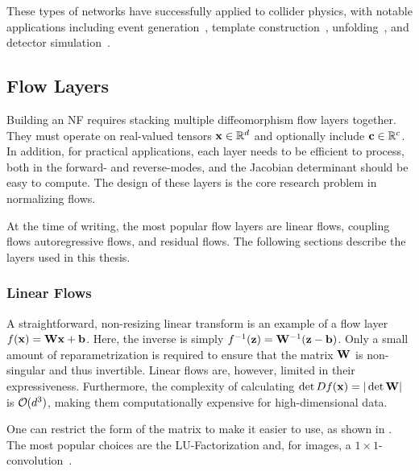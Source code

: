 These types of networks have successfully applied to collider physics, with notable applications including event generation~\cite{EventGen}, template construction~\cite{ANODE, cathode, CURTAINs}, unfolding~\cite{PartonsAndBack}, and detector simulation~\cite{CaloFlow2}.

\subsection{Flow Layers}

Building an NF requires stacking multiple diffeomorphism flow layers together.
They must operate on real-valued tensors $\mathbf{x} \in \mathbb{R}^d$ and optionally include $\mathbf{c} \in \mathbb{R}^c$.
In addition, for practical applications, each layer needs to be efficient to process, both in the forward- and reverse-modes, and the Jacobian determinant should be easy to compute.
The design of these layers is the core research problem in normalizing flows.

At the time of writing, the most popular flow layers are linear flows, coupling flows autoregressive flows, and residual flows.
The following sections describe the layers used in this thesis.

\subsubsection{Linear Flows}

A straightforward, non-resizing linear transform is an example of a flow layer $f(\mathbf{x}) = \mathbf{W}\mathbf{x} + \mathbf{b}$.
Here, the inverse is simply $f^{-1}(\mathbf{z}) = \mathbf{W}^{-1}(\mathbf{z} - \mathbf{b})$.
Only a small amount of reparametrization is required to ensure that the matrix $\mathbf{W}$ is non-singular and thus invertible.
Linear flows are, however, limited in their expressiveness.
Furthermore, the complexity of calculating $\det D f(\mathbf{x}) = |\det \mathbf{W}|$ is $\bigO(d^3)$, making them computationally expensive for high-dimensional data.

One can restrict the form of the matrix to make it easier to use, as shown in .
The most popular choices are the LU-Factorization and, for images, a $1\times1$-convolution~\cite{GlowGenerativeFlow}.

